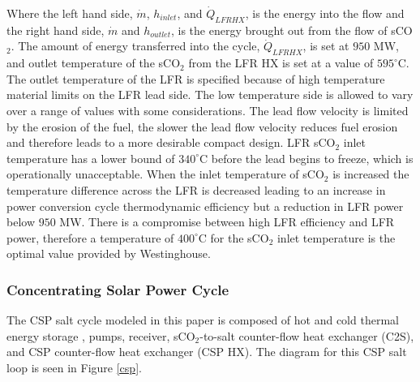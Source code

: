 Where the left hand side, $\dot{m}$, $h_{inlet}$, and $\dot{Q}_{LFRHX}$, is the energy into the flow and the right hand side, $\dot{m}$ and $h_{outlet}$, is the energy brought out from the flow of sCO$_2$. The amount of energy transferred into the cycle, $\dot{Q}_{LFRHX}$, is set at $950$ MW, and outlet temperature of the sCO$_2$ from the LFR HX is set at a value of $595^{\circ}$C. The outlet temperature of the LFR is specified because of high temperature material limits on the LFR lead side. The low temperature side is allowed to vary over a range of values with some considerations. The lead flow velocity is limited by the erosion of the fuel, the slower the lead flow velocity reduces fuel erosion and therefore leads to a more desirable compact design.  LFR sCO$_2$ inlet temperature has a lower bound of $340^{\circ}$C before the lead begins to freeze, which is operationally unacceptable. When the inlet temperature of sCO$_2$ is increased the temperature difference across the LFR is decreased leading to an increase in power conversion cycle thermodynamic efficiency but a reduction in LFR power below $950$ MW. There is a compromise between high LFR efficiency and LFR power, therefore a temperature of $400^{\circ}$C for the sCO$_2$ inlet temperature is the optimal value provided by Westinghouse.


\subsubsection{Concentrating Solar Power Cycle}

The CSP salt cycle modeled in this paper is composed of hot and cold thermal energy storage , pumps, receiver, sCO$_2$-to-salt counter-flow heat exchanger (C2S), and CSP counter-flow heat exchanger (CSP HX). The diagram for this CSP salt loop is seen in Figure \ref{csp}. 



